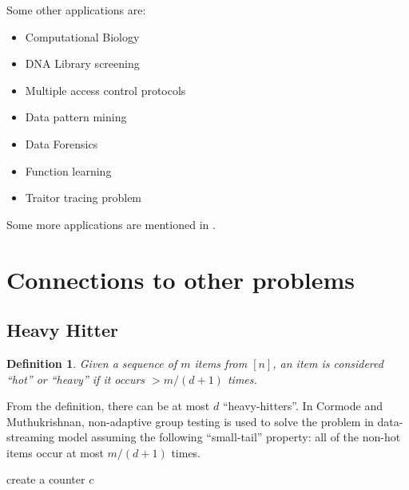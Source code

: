 \documentclass{article}
\newtheorem{definition}{Definition}
\begin{document}
Some other applications are:

\begin{itemize}
\item Computational Biology\cite{ngo2000survey}
\item DNA Library screening\cite{ngo2000survey}
\item Multiple access control protocols\cite{berger1984random}
\item Data pattern mining\cite{macula2004group}
\item Data Forensics\cite{goodrich2005indexing}
\item Function learning\cite{gilbert2008group}
\item Traitor tracing problem\cite{rudra709}
\end{itemize}

Some more applications are mentioned in \citeauthor*{cormodeDisStreams}
\cite{cormodeDisStreams}.

\section{Connections to other problems}

\subsection{Heavy Hitter}

\begin{definition}
  Given a sequence of $m$ items from $[n]$, an item is considered ``hot'' or ``heavy''
  if it occurs $> m/(d+1)$ times.
\end{definition}

From the definition, there can be at most $d$ ``heavy-hitters''. In Cormode and
Muthukrishnan\cite{cormode2005s}, non-adaptive group testing is used to solve the
problem in data-streaming model assuming the following ``small-tail'' property:
all of the non-hot items occur at most $m/(d+1)$ times.

\begin{algorithm}
  create a counter $c$ \\
\end{algorithm}

\begin{algorithm}
\end{algorithm}
\end{document}
